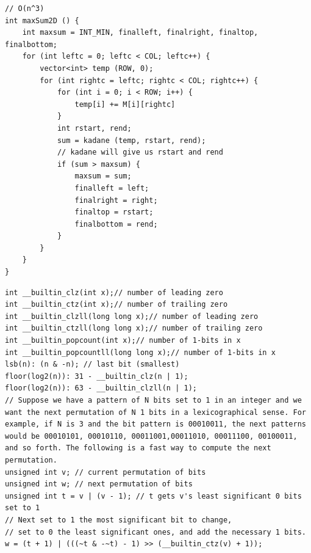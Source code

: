 \documentclass[8pt, a4paper, oneside, twocolumn]{extarticle}
\begin{document}
\begin{verbatim}
// O(n^3)
int maxSum2D () {
    int maxsum = INT_MIN, finalleft, finalright, finaltop, finalbottom;
    for (int leftc = 0; leftc < COL; leftc++) {
        vector<int> temp (ROW, 0);
        for (int rightc = leftc; rightc < COL; rightc++) {
            for (int i = 0; i < ROW; i++) {
                temp[i] += M[i][rightc]
            }
            int rstart, rend;
            sum = kadane (temp, rstart, rend);
            // kadane will give us rstart and rend
            if (sum > maxsum) {
                maxsum = sum;
                finalleft = left;
                finalright = right;
                finaltop = rstart;
                finalbottom = rend;
            } 
        }
    }
}
\end{verbatim}
\begin{verbatim}
int __builtin_clz(int x);// number of leading zero
int __builtin_ctz(int x);// number of trailing zero
int __builtin_clzll(long long x);// number of leading zero
int __builtin_ctzll(long long x);// number of trailing zero
int __builtin_popcount(int x);// number of 1-bits in x
int __builtin_popcountll(long long x);// number of 1-bits in x
lsb(n): (n & -n); // last bit (smallest)
floor(log2(n)): 31 - __builtin_clz(n | 1);
floor(log2(n)): 63 - __builtin_clzll(n | 1);
// Suppose we have a pattern of N bits set to 1 in an integer and we want the next permutation of N 1 bits in a lexicographical sense. For example, if N is 3 and the bit pattern is 00010011, the next patterns would be 00010101, 00010110, 00011001,00011010, 00011100, 00100011, and so forth. The following is a fast way to compute the next permutation.
unsigned int v; // current permutation of bits 
unsigned int w; // next permutation of bits
unsigned int t = v | (v - 1); // t gets v's least significant 0 bits set to 1
// Next set to 1 the most significant bit to change, 
// set to 0 the least significant ones, and add the necessary 1 bits.
w = (t + 1) | (((~t & -~t) - 1) >> (__builtin_ctz(v) + 1));  
\end{verbatim}
\end{document}
